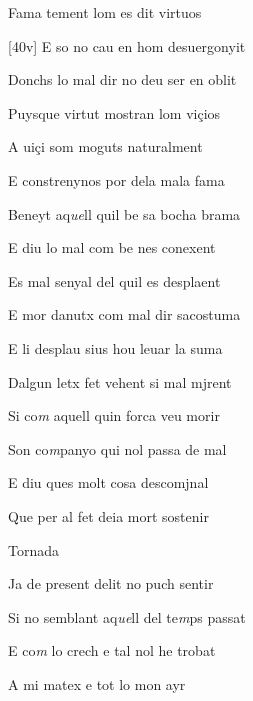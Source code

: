 \documentclass[12pt]{article}
\begin{document}
\begin{estrofa}

 Fama tement lom es dit virtuos

 [40v] E so no cau en hom desuergonyit

 Donchs lo mal dir no deu ser en oblit

 Puysque virtut mostran lom vi\c{c}ios

 A ui\c{c}i som moguts naturalment

 E constrenynos por dela mala fama

 Beneyt aq\textit{ue}ll quil be sa bocha brama

 E diu lo mal com be nes conexent

\end{estrofa}



\begin{estrofa}

 Es mal senyal del quil es desplaent

 E mor danutx com mal dir sacostuma

 E li desplau sius hou leuar la suma

 Dalgun letx fet vehent si mal mjrent

 Si co\textit{m} aquell quin forca veu morir

 Son co\textit{m}panyo qui nol passa de mal

 E diu ques molt cosa descomjnal

 Que per al fet deia mort sostenir

\end{estrofa}


\begin{estrofaExtra}%




\begin{tornada}

Tornada

\end{tornada}


\end{estrofaExtra}


\begin{estrofa}

 Ja de present delit no puch sentir

 Si no semblant aq\textit{ue}ll del te\textit{m}ps passat

 E co\textit{m} lo crech e tal nol he trobat

 A mi matex e tot lo mon ayr

\end{estrofa}
\end{document}
